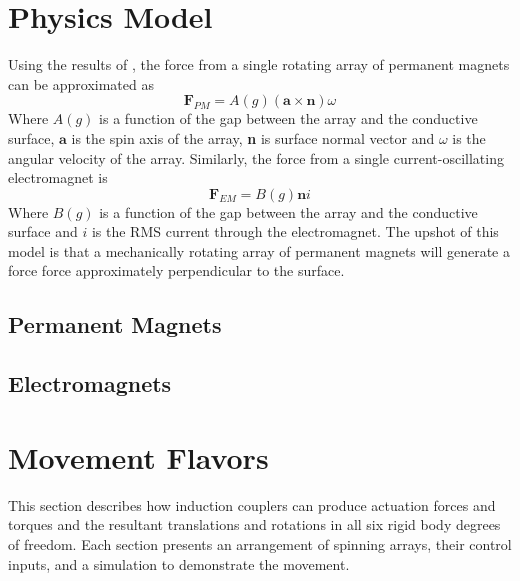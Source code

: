 \documentclass[10pt]{article}
\begin{document}
\section{Physics Model}\label{sec:model}
Using the results of \cite{Paudel2013}, the force from a single rotating array of permanent magnets can be approximated as
\begin{equation}
\label{eq:arrayForce}
\textbf{F}_{PM} = A(g) \left(\textbf{a} \times \textbf{n} \right) \omega
\end{equation}
Where $A(g)$ is a function of the gap between the array and the conductive surface, $\textbf{a}$ is the spin axis of the array, \textbf{n} is surface normal vector and $\omega$ is the angular velocity of the array. 
Similarly, the force from a single current-oscillating electromagnet is
\begin{equation}
\label{EMforce}
\textbf{F}_{EM} = B(g)\textbf{n}i
\end{equation}
Where $B(g)$ is a function of the gap between the array and the conductive surface and $i$ is the RMS current through the electromagnet.
%
The upshot of this model is that a mechanically rotating array of permanent magnets will generate a force  force approximately perpendicular to the surface. 

\subsection{Permanent Magnets}
\subsection{Electromagnets}
\section{Movement Flavors}\label{sec:movements}
This section describes how induction couplers can produce actuation forces and torques and the resultant translations and rotations in all six rigid body degrees of freedom. Each section presents an arrangement of spinning arrays, their control inputs, and a simulation to demonstrate the movement. 
\end{document}
